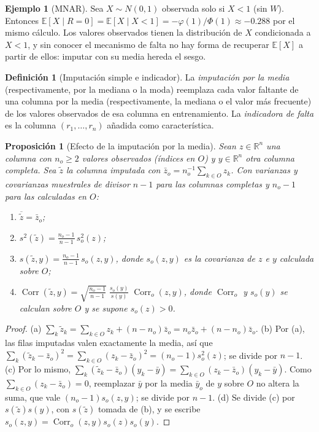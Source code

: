 \documentclass[11pt,a4paper]{article}
\theoremstyle{plain}
\newtheorem{proposicion}[teorema]{Proposición}
\theoremstyle{definition}
\newtheorem{definicion}[teorema]{Definición}
\newtheorem{ejemplo}[teorema]{Ejemplo}
\theoremstyle{remark}
\newcommand{\R}{\mathbb{R}}
\newcommand{\E}{\mathbb{E}}
\newcommand{\Corr}{\operatorname{Corr}}
\newcommand{\1}{\mathbf{1}}
\begin{document}
\begin{ejemplo}[MNAR]\label{ej:mnar}
Sea $X\sim N(0,1)$ observada solo si $X<1$ (sin $W$). Entonces
$\E[X\mid R=0]=\E[X\mid X<1]=-\varphi(1)/\Phi(1)\approx-0.288$ por el mismo
cálculo. Los valores observados tienen la distribución de $X$ condicionada
a $X<1$, y sin conocer el mecanismo de falta no hay forma de recuperar
$\E[X]$ a partir de ellos: imputar con su media hereda el sesgo.
\end{ejemplo}

\begin{definicion}[Imputación simple e indicador]
La \emph{imputación por la media} (respectivamente, por la mediana o la
moda) reemplaza cada valor faltante de una columna por la media
(respectivamente, la mediana o el valor más frecuente) de los valores
observados de esa columna en entrenamiento. La \emph{indicadora de falta}
es la columna $(r_1,\dots,r_n)$ añadida como característica.
\end{definicion}

\begin{proposicion}[Efecto de la imputación por la media]\label{prop:imput}
Sean $z\in\R^n$ una columna con $n_o\ge2$ valores observados (índices en
$O$) y $y\in\R^n$ otra columna completa. Sea $\tilde z$ la columna
imputada con $\bar z_o=n_o^{-1}\sum_{k\in O}z_k$. Con varianzas y
covarianzas muestrales de divisor $n-1$ para las columnas completas y
$n_o-1$ para las calculadas en $O$:
\begin{enumerate}[label=(\alph*)]
\item $\overline{\tilde z}=\bar z_o$;
\item $s^2(\tilde z)=\frac{n_o-1}{n-1}\,s_o^2(z)$;
\item $s(\tilde z,y)=\frac{n_o-1}{n-1}\,s_o(z,y)$, donde $s_o(z,y)$ es la
covarianza de $z$ e $y$ calculada sobre $O$;
\item $\Corr(\tilde z,y)=\sqrt{\frac{n_o-1}{n-1}}\;\frac{s_o(y)}{s(y)}\;\Corr_o(z,y)$,
donde $\Corr_o$ y $s_o(y)$ se calculan sobre $O$ y se supone $s_o(z)>0$.
\end{enumerate}
\end{proposicion}

\begin{proof}
(a) $\sum_k\tilde z_k=\sum_{k\in O}z_k+(n-n_o)\bar z_o=n_o\bar
z_o+(n-n_o)\bar z_o$. (b) Por (a), las filas imputadas valen exactamente
la media, así que $\sum_k(\tilde z_k-\bar z_o)^2=\sum_{k\in O}(z_k-\bar
z_o)^2=(n_o-1)s_o^2(z)$; se divide por $n-1$. (c) Por lo mismo,
$\sum_k(\tilde z_k-\bar z_o)(y_k-\bar y)=\sum_{k\in O}(z_k-\bar
z_o)(y_k-\bar y)$. Como $\sum_{k\in O}(z_k-\bar z_o)=0$, reemplazar
$\bar y$ por la media $\bar y_o$ de $y$ sobre $O$ no altera la suma, que
vale $(n_o-1)s_o(z,y)$; se divide por $n-1$. (d) Se divide (c) por
$s(\tilde z)s(y)$, con $s(\tilde z)$ tomada de (b), y se escribe
$s_o(z,y)=\Corr_o(z,y)s_o(z)s_o(y)$.
\end{proof}
\end{document}
